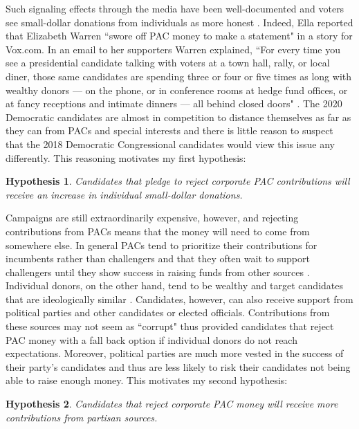 \documentclass[12pt]{article}
\newtheorem{hyp}{Hypothesis}
\begin{document}
 Such signaling effects through the media have been well-documented \citep{iyengar1989} and voters see small-dollar donations from individuals as more honest \citep{bowler2016}. Indeed, Ella \citet{nilsen2019} reported that Elizabeth Warren ``swore off PAC money to make a statement" in a story for Vox.com. In an email to her supporters Warren explained, ``For every time you see a presidential candidate talking with voters at a town hall, rally, or local diner, those same candidates are spending three or four or five times as long with wealthy donors — on the phone, or in conference rooms at hedge fund offices, or at fancy receptions and intimate dinners — all behind closed doors" \citep{nilsen2019}. The 2020 Democratic candidates are almost in competition to distance themselves as far as they can from PACs and special interests and there is little reason to suspect that the 2018 Democratic Congressional candidates would view this issue any differently. This reasoning motivates my first hypothesis:  
 
 \begin{hyp}
 	Candidates that pledge to reject corporate PAC contributions will receive an increase in individual small-dollar donations. 
 \end{hyp}
 
 Campaigns are still extraordinarily expensive, however, and rejecting contributions from PACs means that the money will need to come from somewhere else. In general PACs tend to prioritize their contributions for incumbents rather than challengers \citep{brunell2005} and that they often wait to support challengers until they show success in raising funds from other sources \citep{biersack1993}. Individual donors, on the other hand, tend to be wealthy \citep{brown1995} and target candidates that are ideologically similar \citep{bonica2014}. Candidates, however, can also receive support from political parties and other candidates or elected officials. Contributions from these sources may not seem as ``corrupt" thus provided candidates that reject PAC money with a fall back option if individual donors do not reach expectations. Moreover, political parties are much more vested in the success of their party's candidates and thus are less likely to risk their candidates not being able to raise enough money. This motivates my second hypothesis:
 
 \begin{hyp}
 	Candidates that reject corporate PAC money will receive more contributions from partisan sources.  
 \end{hyp}
 
\end{document}
